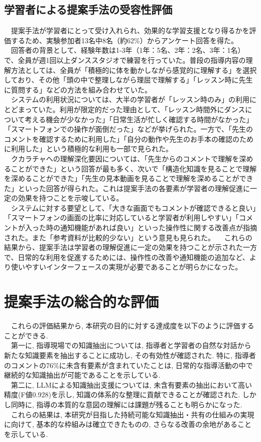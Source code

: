 \subsection{学習者による提案手法の受容性評価}
　提案手法が学習者にとって受け入れられ、効果的な学習支援となり得るかを評価するため、実験参加者13名中8名（約62\%）からアンケート回答を得た。\\
　回答者の背景として、経験年数は1-3年（1年：5名、2年：2名、3年：1名）で、全員が週1回以上ダンススタジオで練習を行っていた。普段の指導内容の理解方法としては、全員が「積極的に体を動かしながら感覚的に理解する」を選択しており、その他「頭の中で整理しながら理屈で理解する」「レッスン時に先生に質問する」などの方法を組み合わせていた。\\
　システムの利用状況については、大半の学習者が「レッスン時のみ」の利用にとどまっていた。利用が限定的だった理由として、「レッスン時間外にダンスについて考える機会が少なかった」「日常生活が忙しく確認する時間がなかった」「スマートフォンでの操作が面倒だった」などが挙げられた。一方で、「先生のコメントを確認するために利用した」「自分の動作や先生のお手本の確認のために利用した」という積極的な利用も一部で見られた。\\
　クカラチャへの理解深化要因については、「先生からのコメントで理解を深めることができた」という回答が最も多く、次いで「構造化知識を見ることで理解を深めることができた」「先生の見本動画を見ることで理解を深めることができた」といった回答が得られた。これは提案手法の各要素が学習者の理解促進に一定の効果を持つことを示唆している。\\
　システムに対する要望として、「大きな画面でもコメントが確認できると良い」「スマートフォンの画面の比率に対応していると学習者が利用しやすい」「コメントが入った時の通知機能があれば良い」といった操作性に関する改善点が指摘された。また「参考資料が比較的少ない」という意見も見られた。
　これらの結果から、提案手法は学習者の理解促進に一定の効果を持つことが示された一方で、日常的な利用を促進するためには、操作性の改善や通知機能の追加など、より使いやすいインターフェースの実現が必要であることが明らかになった。\\


\section{提案手法の総合的な評価}
　これらの評価結果から, 本研究の目的に対する達成度を以下のように評価することができる. \\
　第一に, 指導現場での知識抽出については, 指導者と学習者の自然な対話から新たな知識要素を抽出することに成功し, その有効性が確認された. 特に, 指導者のコメントの76\%に未含有要素が含まれていたことは, 日常的な指導活動の中で継続的な知識抽出が可能であることを示している. \\
　第二に, LLMによる知識抽出支援については, 未含有要素の抽出において高い精度(F値0.928)を示し, 知識の体系的な整理に貢献できることが確認された. しかし同時に, 指導の本質的な意図の理解には課題が残ることも明らかになった. \\
　これらの結果は, 本研究が目指した持続可能な知識抽出・共有の仕組みの実現に向けて, 基本的な枠組みは確立できたものの, さらなる改善の余地があることを示している.\\